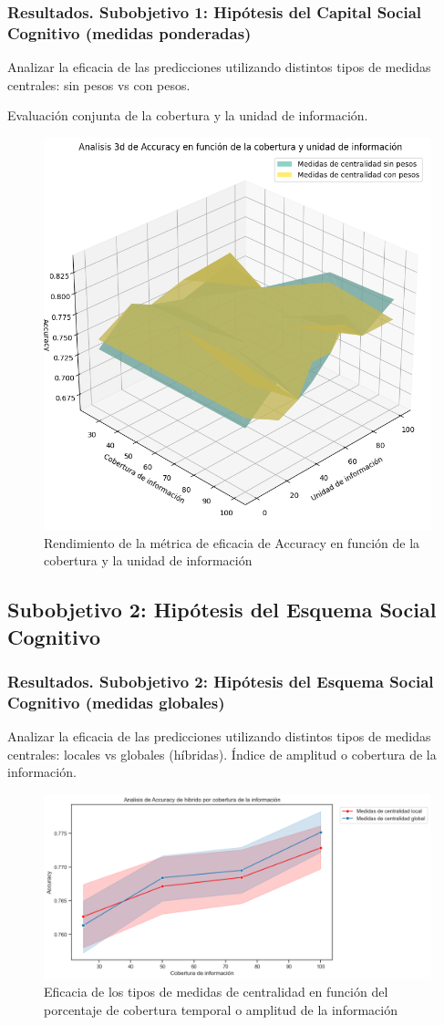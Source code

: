 \documentclass{beamer}
\begin{document}
\begin{frame}
	\frametitle{Resultados. Subobjetivo 1: Hipótesis del Capital Social Cognitivo (medidas ponderadas)}
	\begin{block}{Analizar la eficacia de las predicciones utilizando
		distintos tipos de medidas centrales: sin pesos vs con pesos.}
		

	Evaluación conjunta de la cobertura y la unidad de información.
	\end{block}	
\begin{figure}[H]
	\centering
	\includegraphics[width=0.45\linewidth]{figs/cap7/figura_37}
	\caption{Rendimiento de la métrica de eficacia de Accuracy en función de la cobertura y la unidad de información}
	
	\label{fig:figura221}
\end{figure}
	
	
\end{frame}





\subsection{Subobjetivo 2: Hipótesis del Esquema Social Cognitivo}
\begin{frame}
	\frametitle{Resultados. Subobjetivo 2: Hipótesis del Esquema Social Cognitivo (medidas globales)}
\begin{block}{Analizar la eficacia de las predicciones utilizando
		distintos tipos de medidas centrales: locales vs globales (híbridas).}
		Índice de amplitud o cobertura de la información.
	\end{block}
\begin{figure}[H]
	\centering
	\includegraphics[width=0.6\linewidth]{figs/cap7/figura_43}
	\caption{Eficacia de los tipos de medidas de centralidad en función del porcentaje de cobertura temporal o amplitud de la información}
	
	\label{fig:figura224}
\end{figure}

\end{frame}
\end{document}
